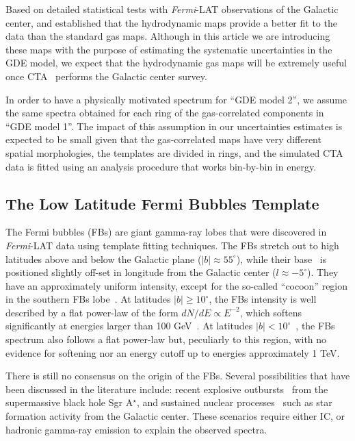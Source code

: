\documentclass[doublespace,nopageskip]{VTthesis}
\begin{document}
Based on detailed statistical tests with \textit{Fermi}-LAT observations of the Galactic center, \cite{2018NatAs...2..387M,2019JCAP...09..042M} and \cite{2020PhRvD.102b3023B} established that the hydrodynamic maps provide a better fit to the data than the standard gas maps. Although in this article we are introducing these  maps with the purpose of estimating the systematic uncertainties in the GDE model, we expect that the hydrodynamic gas maps will be extremely useful once CTA~\citep{2021JCAP...01..057A} performs the Galactic center survey.  

In order to have a physically motivated spectrum for ``GDE model 2'', we assume the same spectra obtained for each ring of the gas-correlated components in ``GDE model 1''. The impact of this assumption in our uncertainties estimates is expected to be small given that the gas-correlated maps have very different spatial morphologies, the templates are divided in rings, and the simulated CTA data is fitted using an analysis procedure that works bin-by-bin in energy. 


\subsection{The Low Latitude Fermi Bubbles Template}
\label{subsec:FBs}

The Fermi bubbles (FBs) are giant gamma-ray lobes that were discovered in \textit{Fermi}-LAT data \citep{2010ApJ...724.1044S} using template fitting techniques. The FBs stretch out to high latitudes above and below the Galactic plane ($\lvert b \rvert \approx 55^\circ$), while their base~\citep{2019A&A...625A.110H} is positioned slightly off-set in longitude from the Galactic center ($l\approx-5^\circ$). 
They have an approximately uniform intensity, except for the so-called ``cocoon'' region in the southern FBs lobe~\citep{2012ApJ...753...61S, 2014ApJ...793...64A}. At latitudes $\lvert b
\rvert \geq 10^\circ$, the FBs intensity is well described by a flat power-law of the form $dN/dE\propto E^{-2}$, which  softens significantly at energies larger than 100 GeV~\citep{2014ApJ...793...64A}. At latitudes $\lvert b \rvert < 10^\circ$~\citep{2016ApJS..223...26A,2017ApJ...840...43A,2017JCAP...08..022S,2019A&A...625A.110H}, the FBs spectrum also follows a flat power-law but, peculiarly to this region, with no evidence for softening nor an energy cutoff up to energies approximately 1 TeV. 

There is still no consensus on the origin of the FBs. Several possibilities that have been discussed in the literature include: recent explosive outbursts~\citep{2010ApJ...724.1044S} from the supermassive black hole Sgr A$^\star$, and sustained nuclear processes~\citep{2015ApJ...808..107C} such as star formation activity from the Galactic center. These scenarios require either IC, or hadronic gamma-ray emission to explain the observed spectra.
\end{document}
